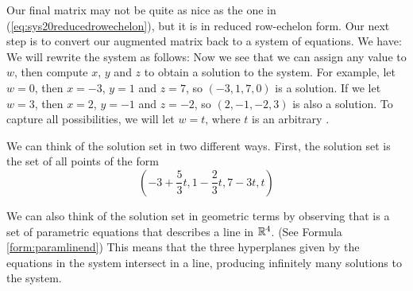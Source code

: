 \documentclass{ximera}
\begin{document}
\begin{example}
\begin{explanation}
 
 Our final matrix may not be quite as nice as the one in (\ref{eq:sys20reducedrowechelon}), but it is in reduced row-echelon form.  Our next step is to convert our augmented matrix back to a system of equations.  We have:
 We will rewrite the system as follows:
 Now we see that we can assign any value to $w$, then compute $x$, $y$ and $z$ to obtain a solution to the system.  For example, let $w=0$, then $x=-3$, $y=1$ and $z=7$, so $(-3, 1, 7, 0)$ is a solution.  If we let $w=3$, then $x=2$, $y=-1$ and $z=-2$, so $(2, -1, -2, 3)$ is also a solution.   To capture all possibilities, we will let $w=t$, where $t$ is an arbitrary .   
 
  We can think of the solution set in two different ways.  First, the solution set is the set of all points of the form $$\left(-3+\frac{5}{3}t, 1-\frac{2}{3}t, 7-3t, t\right)$$ 
 
 We can also think of the solution set in geometric terms by observing that 
 is a set of parametric equations that describes a line in $\mathbb{R}^4$.  (See Formula \ref{form:paramlinend})  This means that the three hyperplanes given by the equations in the system intersect in a line, producing infinitely many solutions to the system.

\end{explanation}
\end{example}
\end{document}
